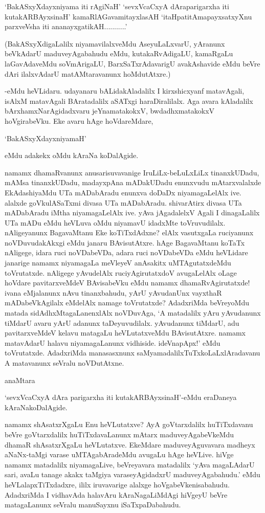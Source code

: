`BakASxyXdayxniyama iti rAgiNaH' `sevxVcaCxyA dAraparigarxha iti kutakARBAyxsinaH' kamaRlAGavamitayxlasAH `itaHpatitAmapayxsatxyXnu parxveVsha iti ananayxgatikAH...........'

(BakASxyXdigaLalilx niyamavilalxveMdu AseyuLaLxvarU, yAranunx beVkAdarU maduveyAgabahudu eMdu, kutakaRvAdigaLU, kamaRgaLu laGavAdaveMdu soVmArigaLU, BarxSaTxrAdavarigU avakAshavide eMdu beVre dAri ilalxvAdarU matAMtaravanunx hoMdutAtxre.)

-eMdu heVLidaru. udayanaru bALidakAladalilx I kirxshicxyanf matavAgali, isAlxM matavAgali BAratadalilx aSATxgi haraDiralilalx. Aga avara kAladalilx bArxhamxNarAgidadxvaru jeYnamatakokxV, bwdadhxmatakokxV hoVgirabeVku. Eke avaru hAge hoVdareMdare,

`BakASxyXdayxniyamaH'

eMdu adakekx oMdu kAraNa koDalAgide.

namamx dhamaRvanunx anusarisuvavanige IruLiLx-beLuLxLiLx tinanxkUDadu, mAMsa tinanxkUDadu, madayxpAna mADakUDadu enunxvudu mAtarxvalalxde EkAdashiyaMdu UTa mADabAradu enunxva doDaDx niyamagaLelAlx ive. alalxde goVkulASaTxmi divasa UTa mADabAradu. shivarAtirx divasa UTa mADabAradu iMtha niyamagaLelAlx ive. yAva jAgadalelxV Agali I dinagaLalilx UTa mADu eMdu heVLuva oMdu niyamavU idadxMte toVruvudilalx. nAligeyanunx BagavaMtanu Eke koTiTxdAdxne? elAlx vasutxgaLa ruciyanunx noVDuvudakAkxgi eMdu janaru BAvisutAtxre. hAge BagavaMtanu koTaTx nAligege, idara ruci noVDabeVDa, adara ruci noVDabeVDa eMdu heVLidare janarige namamx niyamagaLa meVleyeV anAsakitx uMTAgutatxdeMdu toVrutatxde. nAligege yAvudelAlx
ruciyAgirutatxdoV avugaLelAlx oLage hoVdare pavitarxveMdeV BAvisabeVku eMdu namamx dhamaRvAgirutatxde! ivana eMjalanunx nAvu tinanxbahudu, yArU yAvudanUnx vayxthaR mADabeVkAgilalx eMdelAlx namage toVrutatxde? AdadxriMda beVreyoMdu matada sidAdhxMtagaLanenxlAlx noVDuvAga, `A matadalilx yAru yAvudanunx tiMdarU avaru yArU adanunx taDeyuvudilalx. yAvudanunx tiMdarU, adu pavitarxveMdeV kelavu matagaLu heVLutatxveMdu BAvisutAtxre. namamx matavAdarU halavu niyamagaLanunx vidhiside. ideVnapApx!' eMdu toVrutatxde. AdadxriMda 
manasasxnunx saMyamadalilxTuTxkoLaLxlAradavanu A matavanunx seVralu noVDutAtxne.

anaMtara 

`sevxVcaCxyA dAra parigarxha iti kutakARBAyxsinaH'-eMdu eraDaneya kAraNakoDalAgide.

namamx shAsatxrXgaLu Enu heVLutatxve? AyA goVtarxdalilx huTiTxdavanu beVre goVtarxdalilx huTiTxdavaLanunx mAtarx maduveyAgabeVkeMdu dhamaR shAsatxrXgaLu heVLutatxve. EkeMdare maduveyAguvavara madheyx aNaNx-taMgi varase uMTAgabAradeMdu avugaLu hAge heVLive. hiVge 
namamx matadalilx niyamagaLive, beVreyavara matadalilx `yAva magaLAdarU sari, avaLu tanage akakx taMgiya varaseyAgidadxrU maduveyAgabahudu.' eMdu heVLalapxTiTxdadxre, ililx iruvavarige alalxge hoVgabeVkenisabahudu. AdadxriMda I vidhavAda halavAru kAraNagaLiMdAgi 
hiVgeyU beVre matagaLanunx seVralu manuSayxnu iSaTxpaDabahudu.

